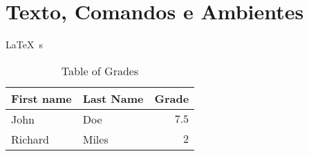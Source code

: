 \documentclass[a4paper,12pt]{article}%
\begin{document}
\section{Texto, Comandos e Ambientes} %

\LaTeX \ s~

 \begin{table}[hbt]
\caption{Table of Grades}
\centering
\begin{tabular}{llr}

\cmidrule(r){1-3}
First name & Last Name & Grade \\
\midrule
John & Doe & $7.5$ \\
Richard & Miles & $2$ \\
\bottomrule
\end{tabular}
\label{tab:label}
\end{table}
\end{document}
